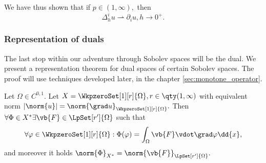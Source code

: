 \begin{remark}
    We have thus shown that if $p \in (1, \infty),$ then
    \[
	    \Delta_h^i u \rightharpoonup \partial_{i} u, h \to 0^+.
    \]
\end{remark}

\subsubsection{Representation of duals}
\label{sec:dual_representation}

The last stop within our adventure through Sobolev spaces will be the dual. We present a representation theorem for dual spaces of certain Sobolev spaces. The proof will use techniques developed later, in the chapter \ref{sec:monotone_operator}.

\begin{theorem}
	Let $\Omega \in C^{0,1}.$ Let $X = \WkpzeroSet[1][r]{\Omega}, r \in \qty(1,\infty)$ with equivalent norm $|\norm{u}| = \norm{\grad u}_{\WkpzeroSet[1][r]{\Omega}}.$ Then $\forall \Phi \in X^{*} \exists \vb{F} \in \LpSet[r']{\Omega}$ such that
	\[
		\forall \varphi \in \WkpzeroSet[1][r]{\Omega}: \Phi(\varphi) = \int_{\Omega}\vb{F} \vdot \grad \varphi\dd{x},
	\]
	and moreover it holds $ \norm{\Phi}_{X^{*}} = \norm{\vb{F}}_{\LpSet[r']{\Omega}}.$
\end{theorem}
